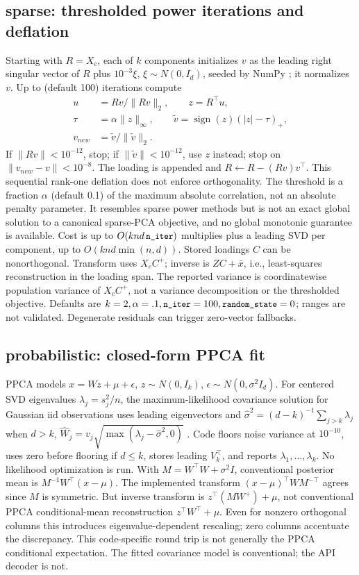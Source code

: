 \documentclass[conference]{IEEEtran}
\begin{document}
\subsection{sparse: thresholded power iterations and deflation}
Starting with \(R=X_c\), each of \(k\) components initializes \(v\) as the leading right singular vector of \(R\) plus \(10^{-3}\xi\), \(\xi\sim N(0,I_d)\), seeded by NumPy ; it normalizes \(v\). Up to  (default 100) iterations compute
\begin{align*}
u&=Rv/\|Rv\|_2,\qquad z=R^\top u,\\
\tau&=\alpha\|z\|_\infty,\qquad \tilde v=\operatorname{sign}(z)(|z|-\tau)_+,\\
v_{new}&=\tilde v/\|\tilde v\|_2.
\end{align*}
If \(\|Rv\|<10^{-12}\), stop; if \(\|\tilde v\|<10^{-12}\), use \(z\) instead; stop on \(\|v_{new}-v\|<10^{-8}\). The loading is appended and \(R\leftarrow R-(Rv)v^\top\). This sequential rank-one deflation does not enforce orthogonality. The threshold is a fraction \(\alpha\) (default 0.1) of the maximum absolute correlation, not an absolute penalty parameter. It resembles sparse power methods but is not an exact global solution to a canonical sparse-PCA objective, and no global monotonic guarantee is available. Cost is up to \(O(knd\,\texttt{\small n\_iter})\) multiplies plus a leading SVD per component, up to \(O(knd\min(n,d))\).
Stored loadings \(C\) can be nonorthogonal. Transform uses \(X_cC^+\); inverse is \(ZC+\bar x\), i.e., least-squares reconstruction in the loading span. The reported variance is coordinatewise population variance of \(X_cC^+\), not a variance decomposition or the thresholded objective. Defaults are \(k=2,\alpha=.1,\texttt{\small n\_iter}=100,\texttt{\small random\_state}=0\); ranges are not validated. Degenerate residuals can trigger zero-vector fallbacks.
\subsection{probabilistic: closed-form PPCA fit}
PPCA models \(x=Wz+\mu+\epsilon\), \(z\sim N(0,I_k)\), \(\epsilon\sim N(0,\sigma^2I_d)\). For centered SVD eigenvalues \(\lambda_j=s_j^2/n\), the maximum-likelihood covariance solution for Gaussian iid observations uses leading eigenvectors and \(\hat\sigma^2=(d-k)^{-1}\sum_{j>k}\lambda_j\) when \(d>k\), \(\hat W_j=v_j\sqrt{\max(\lambda_j-\hat\sigma^2,0)}\) \cite{tippingbishop1999}. Code floors noise variance at \(10^{-10}\), uses zero before flooring if \(d\leq k\), stores leading \(V_k^\top\), and reports \(\lambda_1,\ldots,\lambda_k\). No likelihood optimization is run.
With \(M=W^\top W+\sigma^2I\), conventional posterior mean is \(M^{-1}W^\top(x-\mu)\). The implemented transform \((x-\mu)^\top W M^{-\top}\) agrees since \(M\) is symmetric. But inverse transform is \(z^\top(MW^+)+\mu\), not conventional PPCA conditional-mean reconstruction \(z^\top W^\top+\mu\). Even for nonzero orthogonal columns this introduces eigenvalue-dependent rescaling; zero columns accentuate the discrepancy. This code-specific round trip is not generally the PPCA conditional expectation. The fitted covariance model is conventional; the API decoder is not.
\end{document}

